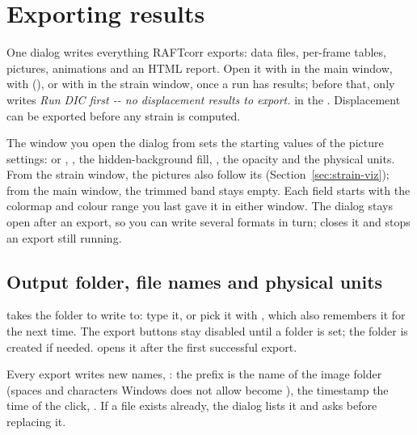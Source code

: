 \section{Exporting results}
\label{sec:export}

One dialog writes everything RAFTcorr exports: data files, per-frame tables, pictures, animations
and an HTML report. Open it with  in the main window, with
 (), or with  in the strain window, once
a run has results; before that,  only writes \emph{Run DIC first -{}- no
displacement results to export.} in the . Displacement can be exported before any strain
is computed.

The window you open the dialog from sets the starting values of the picture settings:
 or , , the hidden-background
fill, , the opacity and the physical units. From the strain window, the
pictures also follow its  (Section~\ref{sec:strain-viz});
from the main window, the trimmed band stays empty. Each field starts with the colormap and colour range
you last gave it in either window. The dialog stays open after an export, so you can write several
formats in turn;  closes it and stops an export still running.

\subsection{Output folder, file names and physical units}

 takes the folder to write to: type it, or pick it with , which also
remembers it for the next time. The export buttons stay disabled until a folder is set; the folder
is created if needed.  opens it after the first successful export.

Every export writes new names, : the prefix is the name of the
image folder (spaces and characters Windows does not allow become \file{\_}), the timestamp the
time of the click, . If a file exists already, the dialog lists it and asks
before replacing it.

